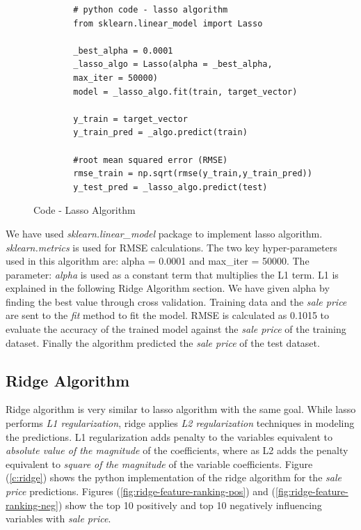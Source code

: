 \documentclass[sigconf]{acmart}
\begin{document}
	\begin{figure}[htb]
		\begin{verbatim}	
		# python code - lasso algorithm
		from sklearn.linear_model import Lasso
		
		_best_alpha = 0.0001		
		_lasso_algo = Lasso(alpha = _best_alpha, 
		max_iter = 50000)	
		model = _lasso_algo.fit(train, target_vector)  
		
		y_train = target_vector
		y_train_pred = _algo.predict(train)
		
		#root mean squared error (RMSE)
		rmse_train = np.sqrt(rmse(y_train,y_train_pred))		
		y_test_pred = _lasso_algo.predict(test)	
		\end{verbatim}
		\caption{Code - Lasso Algorithm} \label{c:lasso} 
	\end{figure}
	
	We have used {\em sklearn.linear\_model} package to implement lasso algorithm. {\em sklearn.metrics} is used for RMSE calculations. The two key hyper-parameters used in this algorithm are: alpha = 0.0001 and max\_iter = 50000. The parameter: {\em alpha} is used as a constant term that multiplies the L1 term. L1 is explained in the following Ridge Algorithm section. We have given alpha by finding the best value through cross validation. Training data and the {\em sale price} are sent to the {\em fit} method to fit the model. RMSE is calculated as 0.1015 to evaluate the accuracy of the trained model against the {\em sale price} of the training dataset. Finally the algorithm predicted the {\em sale price} of the test dataset.
	
	\subsection{Ridge Algorithm}
	
	Ridge algorithm is very similar to lasso algorithm with the same goal. While lasso performs {\em L1 regularization}, ridge applies {\em L2 regularization} techniques in modeling the predictions. L1 regularization adds penalty to the variables equivalent to {\em absolute value of the magnitude} of the coefficients, where as L2 adds the penalty equivalent to {\em square of the magnitude} of the variable coefficients. Figure (\ref{c:ridge}) shows the python implementation of the ridge algorithm for the {\em sale price} predictions. Figures ({\ref{fig:ridge-feature-ranking-pos}}) and (\ref{fig:ridge-feature-ranking-neg}) show the top 10 positively and top 10 negatively influencing variables with {\em sale price}.
	
\end{document}
